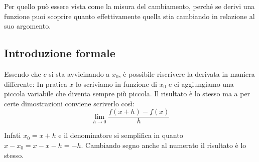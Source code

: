 Per quello può essere vista come la misura del cambiamento, perché se derivi una funzione puoi scoprire quanto effettivamente quella stia cambiando in relazione al suo argomento.

\subsection{Introduzione formale}
Essendo che $c$ si sta avvicinando a $x_0$, è possibile riscrivere la derivata in maniera differente: In pratica $x$ lo scriviamo in funzione di $x_0$ e ci aggiungiamo una piccola variabile che diventa sempre più piccola. Il risultato è lo stesso ma a per certe dimostrazioni conviene scriverlo così:
\begin{equation*}
	\lim_{h \to 0} \dfrac{f(x + h) - f(x)}{h}
\end{equation*}

Infati $x_0 = x + h$ e il denominatore si semplifica in quanto $x - x_0 = x - x - h = -h$. Cambiando segno anche al numerato il risultato è lo stesso.


